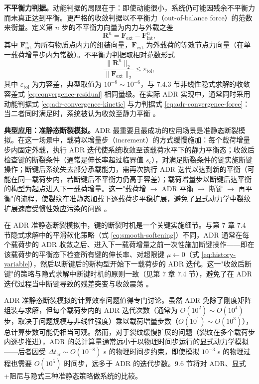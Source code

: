 \textbf{不平衡力判据。}动能判据的局限在于：即使动能很小，系统仍可能因残余不平衡力而未真正达到平衡。更严格的收敛判据以不平衡力（out-of-balance force）的范数来衡量。定义第 $n$ 步的不平衡力向量为内力与外载之差
\begin{equation}
  \mathbf{R}^{n}
  =\mathbf{F}_{\text{ext}}-\mathbf{F}_{\text{int}}^{n},
  \label{eq:adr-residual}
\end{equation}
其中 $\mathbf{F}_{\text{int}}^{n}$ 为所有物质点内力的组装向量，$\mathbf{F}_{\text{ext}}$ 为外载荷的等效节点力向量（在单一载荷增量步内为常数）。不平衡力判据取相对范数形式
\begin{equation}
  \frac{\lVert\mathbf{R}^{n}\rVert_{2}}{\lVert\mathbf{F}_{\text{ext}}\rVert_{2}}
  \le \varepsilon_{\text{tol}},
  \label{eq:adr-convergence-force}
\end{equation}
其中 $\varepsilon_{\text{tol}}$ 为力容差，典型取值为 $10^{-8}\sim10^{-6}$，与 7.4.3 节非线性隐式求解的收敛容差式 \eqref{eq:convergence-residual} 相同量级。在实际 ADR 实现中，通常同时采用动能判据式 \eqref{eq:adr-convergence-kinetic} 与力判据式 \eqref{eq:adr-convergence-force}：当二者同时满足时，系统被认为收敛至静力平衡 \cite{KilicMadenci2010,MadenciOterkus2014}。

\textbf{典型应用：准静态断裂模拟。}ADR 最重要且最成功的应用场景是准静态断裂模拟。在这一场景中，载荷以增量步（increment）的方式缓慢施加：每个载荷增量步内固定外载，执行 ADR 迭代使系统收敛至该载荷水平下的静力平衡态；收敛后检查键的断裂条件（通常是伸长率超过临界值 $s_c$），对满足断裂条件的键实施断键操作；断键后系统失去部分承载能力，需再次执行 ADR 迭代以达到新的平衡（可能在同一载荷步内，若断键后不平衡力仍高于容差）；载荷增量步以断键后达平衡的构型为起点进入下一载荷增量。这一"载荷增 $\to$ ADR 平衡 $\to$ 断键 $\to$ 再平衡"的流程，使裂纹在准静态加载下逐载荷步平稳扩展，避免了显式动力学中裂纹扩展速度受惯性效应污染的问题 \cite{KilicMadenci2010,Ni2019,Li2019}。

在 ADR 准静态断裂模拟中，键的断裂时机是一个关键实施细节。与第 7 章 7.4 节隐式求解中的平滑软化策略（式 \eqref{eq:smooth-softening}）不同，ADR 通常在每个载荷步的 ADR 收敛之后、进入下一载荷增量之前一次性施加断键操作——即在该载荷步的平衡态下检查所有键的伸长率、对超限键 $\mu\leftarrow0$（式 \eqref{eq:history-variable}），然后以断键后的新构型开始下一载荷步的 ADR 迭代。这一"收敛后断键"的策略与隐式求解中断键时机的原则一致（见第 7 章 7.4 节），避免了在 ADR 迭代过程当中断键导致的残差突变与收敛震荡 \cite{KilicMadenci2010,Ni2019}。

ADR 准静态断裂模拟的计算效率问题值得专门讨论。虽然 ADR 免除了刚度矩阵组装与求解，但每个载荷步内的 ADR 迭代次数（通常为 $O(10^2)\sim O(10^4)$ 步，取决于问题规模与非线性强度）乘以载荷增量步数（$O(10^1)\sim O(10^3)$），总计算步数可能仍相当可观。然而，对于裂纹缓慢扩展的问题（裂纹在多个载荷步内逐步推进），ADR 的总计算量通常远小于以物理时间步运行的显式动力学模拟——后者因受 $\Delta t_{\text{cr}}\sim O(10^{-8})$ s 的物理时间步约束，即使模拟 $10^{-3}$ s 的物理过程也需要 $O(10^5)$ 时间步，远多于 ADR 的迭代步数。9.6 节将对 ADR、显式+阻尼与隐式三种准静态策略做系统的比较。

